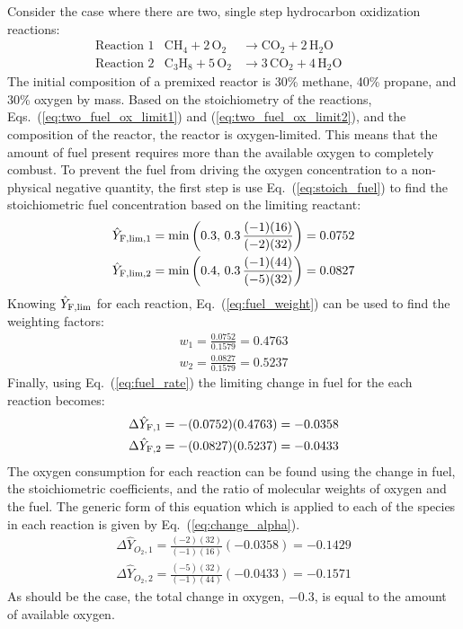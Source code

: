 Consider the case where there are two, single step hydrocarbon oxidization reactions:
\begin{align}
&\mbox{Reaction 1}& \mathrm{CH_4 + 2 \, O_2} &\rightarrow  \mathrm{CO_2 + 2 \, H_2O}       && && \label{eq:two_fuel_ox_limit1} \\
&\mbox{Reaction 2}& \mathrm{C_3H_8 + 5 \, O_2} &\rightarrow \mathrm{3 \,CO_2 + 4 \, H_2O}  && && \label{eq:two_fuel_ox_limit2}
\end{align}
The initial composition of a premixed reactor is 30\% methane, 40\% propane, and 30\% oxygen by mass. Based on the stoichiometry of the reactions, Eqs.~(\ref{eq:two_fuel_ox_limit1}) and (\ref{eq:two_fuel_ox_limit2}), and the composition of the reactor, the reactor is oxygen-limited. This means that the amount of fuel present requires more than the available oxygen to completely combust. To prevent the fuel from driving the oxygen concentration to a non-physical negative quantity, the first step is use Eq.~(\ref{eq:stoich_fuel}) to find the stoichiometric fuel concentration based on the limiting reactant:
\begin{align}
\hat{Y}_{{\rm F,lim},1} = \min \left (0.3,\,0.3\,\frac{(-1) (16)}{(-2)(32)} \right) = 0.0752 \\
\hat{Y}_{{\rm F,lim},2} = \min \left (0.4,\,0.3\,\frac{(-1) (44)}{(-5)(32)} \right) = 0.0827
\end{align}
Knowing $\hat{Y}_{\rm F,lim}$ for each reaction, Eq.~(\ref{eq:fuel_weight}) can be used to find the weighting factors:
\begin{align}
w_1 =  \frac{0.0752}{0.1579} = 0.4763 \\
w_2 =  \frac{0.0827}{0.1579} = 0.5237
\end{align}
Finally, using Eq.~(\ref{eq:fuel_rate}) the limiting change in fuel for the each reaction becomes:
\begin{align}
\Delta \hat{Y}_{{\rm F},1} = - (0.0752)(0.4763) = -0.0358 \\
\Delta \hat{Y}_{{\rm F},2} = - (0.0827)(0.5237) = -0.0433
\end{align}
The oxygen consumption for each reaction can be found using the change in fuel, the stoichiometric coefficients, and the ratio of molecular weights of oxygen and the fuel. The generic form of this equation which is applied to each of the species in each reaction is given by Eq.~(\ref{eq:change_alpha}).
\begin{align}
\Delta \hat{Y}_{\si{O_2},1} = \frac{(-2)(32)}{(-1)(16)}(-0.0358) = -0.1429 \\
\Delta \hat{Y}_{\si{O_2},2} = \frac{(-5)(32)}{(-1)(44)}(-0.0433) = -0.1571
\end{align}
As should be the case, the total change in oxygen, $-0.3$, is equal to the amount of available oxygen.

